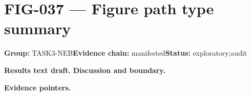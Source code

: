 \clearpage
\section{FIG-037 --- Figure path type summary}
\label{figpage:fig-037}
\textbf{Group:} TASK3-NEB\quad \textbf{Evidence chain:} manifested\quad \textbf{Status:} exploratory;audit

\textbf{Results text draft.} 
\textbf{Discussion and boundary.} 


\textbf{Evidence pointers.}



\vfill

